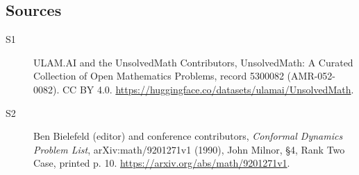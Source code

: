 \documentclass[11pt]{article}
\begin{document}
\subsection{Sources}
\begin{description}
\item[\hypertarget{source:5300082:1}{S1}] ULAM.AI and the UnsolvedMath Contributors, UnsolvedMath: A Curated Collection of Open Mathematics Problems, record 5300082 (AMR-052-0082). CC BY 4.0. \url{https://huggingface.co/datasets/ulamai/UnsolvedMath}.
\item[\hypertarget{source:5300082:2}{S2}] Ben Bielefeld (editor) and conference contributors, \emph{Conformal Dynamics Problem List}, arXiv:math/9201271v1 (1990), John Milnor, \S4, Rank Two Case, printed p. 10. \url{https://arxiv.org/abs/math/9201271v1}.
\end{description}
\label{end:5300082}
\end{document}
